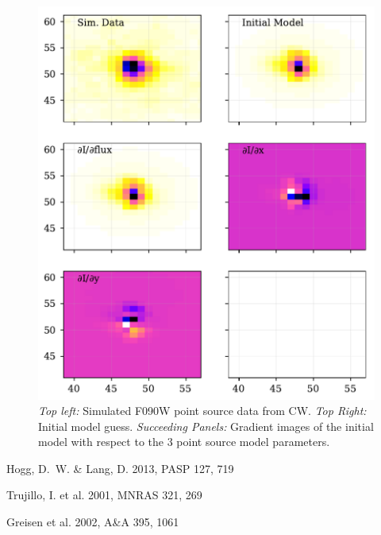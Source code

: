 \documentclass[modern]{aastex62}
\begin{document}
\begin{figure}
\includegraphics[width=\textwidth]{figures/demo_f090w_pointsource.pdf}
\caption{{\it Top left: } Simulated F090W point source data from CW.  
{\it Top Right:} Initial model guess.  
{\it Succeeding Panels:} Gradient images of the initial model with respect to the 3 point source model parameters.
\label{fig:f090w}}
\end{figure}



\begin{thebibliography}{}\raggedright

Hogg, D.~W. \& Lang, D. 2013, PASP 127, 719

Trujillo, I. et al. 2001, MNRAS 321, 269

Greisen et al. 2002, A\&A 395, 1061

\end{thebibliography}
\end{document}
